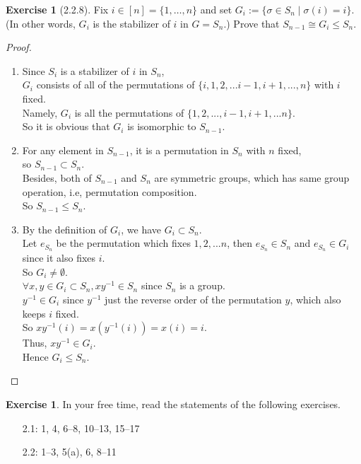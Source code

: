 \documentclass{amsart}
\theoremstyle{plain}
\theoremstyle{definition}
\newtheorem{exer}[lem]{Exercise}
\begin{document}
\begin{exer}[2.2.8]
Fix $i\in [n]=\{1,\ldots,n\}$ and set 
$G_i:=\{\sigma\in S_n\mid\sigma(i)=i\}$.
(In other words, $G_i$ is the stabilizer of $i$ in $G=S_n$.)
Prove that $S_{n-1}\cong G_i\leq S_n$.
\begin{proof}
	$ $\newline
	\begin{enumerate}
		\item
		Since $S_i$ is a stabilizer of $i$ in $S_n$, \\
		$G_i$ consists of all of the permutations of $\{i,1,2,...i-1,i+1,...,n\}$ with $i$ fixed. \\
		Namely, $G_i$ is all the permutations of $\{1,2,...,i-1,i+1,...n\}$.\\
		So it is obvious that $G_i$ is isomorphic to $S_{n-1}$.
		\item
	    For any element in $S_{n-1}$, it is a permutation in $S_n$ with $n$ fixed, \\
		so $S_{n-1} \subset S_n$.\\
		Besides, both of $S_{n-1}$ and $S_n$ are symmetric groups, which has same group operation, i.e, permutation composition.\\
		So $S_{n-1} \leq S_n$. \\
		\item
		By the definition of $G_i$, we have $G_i \subset S_n$.\\
		Let $e_{S_n}$ be the permutation which fixes $1,2,...n$, then $e_{S_n} \in S_{n}$ and $e_{S_n} \in G_{i}$ since it also fixes $i$.\\
		So $G_i \neq \emptyset$. \\
		$\forall x,y \in G_i \subset S_n, xy^{-1} \in S_n$ since $S_n$ is a group.\\
		$y^{-1} \in G_i$ since $y^{-1}$ just the reverse order of the permutation $y$, which also keeps $i$ fixed. \\
		So $xy^{-1}(i) = x(y^{-1}(i)) = x(i) = i$. \\
		Thus, $xy^{-1} \in G_i$.\\
		Hence $G_i \leq S_n$.

	\end{enumerate}
	

\end{proof}




\end{exer}

\begin{exer}
In your free time, read the statements of the following exercises.
\begin{enumerate}[1.2:]
\item[2.1:] 1, 4, 6--8, 10--13, 15--17
\item[2.2:] 1--3, 5(a), 6, 8--11
\end{enumerate}
\end{exer}
\end{document}
